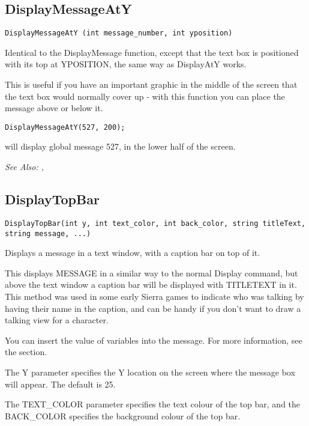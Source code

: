 \subsection{DisplayMessageAtY}\label{DisplayMessageAtY}%

\begin{verbatim}
DisplayMessageAtY (int message_number, int yposition)
\end{verbatim}
Identical to the DisplayMessage function, except that the text box
is positioned with its top at YPOSITION, the same way as DisplayAtY
works.

This is useful if you have an important graphic in the middle of the screen that
the text box would normally cover up - with this function you can place the message
above or below it.

\begin{verbatim}
DisplayMessageAtY(527, 200);
\end{verbatim}
will display global message 527, in the lower half of the screen.

\it{See Also:} , 



\subsection{DisplayTopBar}\label{DisplayTopBar}%

\begin{verbatim}
DisplayTopBar(int y, int text_color, int back_color, string titleText, string message, ...)
\end{verbatim}
Displays a message in a text window, with a caption bar on top of it.

This displays MESSAGE in a similar way to the normal Display command, but above the
text window a caption bar will be displayed with TITLETEXT in it. This method was
used in some early Sierra games to indicate who was talking by having their name in
the caption, and can be handy if you don't want to draw a talking view for a character.

You can insert the value of variables into the message. For more information,
see the  section.

The Y parameter specifies the Y location on the screen where the message box will appear.
The default is 25.

The TEXT_COLOR parameter specifies the text colour of the top bar, and the BACK_COLOR specifies
the background colour of the top bar.

